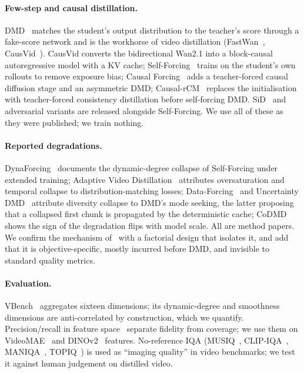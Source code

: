 \documentclass[10pt,twocolumn,letterpaper]{article}
\begin{document}
\paragraph{Few-step and causal distillation.} DMD~\cite{dmd,dmd2} matches the student's output distribution to the teacher's score through a fake-score network and is the workhorse of video distillation (FastWan~\cite{fastwan}, CausVid~\cite{causvid}). CausVid converts the bidirectional Wan2.1 into a block-causal autoregressive model with a KV cache; Self-Forcing~\cite{selfforcing} trains on the student's own rollouts to remove exposure bias; Causal Forcing~\cite{causalforcing} adds a teacher-forced causal diffusion stage and an asymmetric DMD; Causal-rCM~\cite{causalrcm,rcm} replaces the initialisation with teacher-forced consistency distillation before self-forcing DMD. SiD~\cite{sid} and adversarial variants are released alongside Self-Forcing. We use all of these as they were published; we train nothing.

\paragraph{Reported degradations.} DynaForcing~\cite{dynaforcing} documents the dynamic-degree collapse of Self-Forcing under extended training; Adaptive Video Distillation~\cite{avd} attributes oversaturation and temporal collapse to distribution-matching losses; Data-Forcing~\cite{dataforcing} and Uncertainty DMD~\cite{uncertaintydmd} attribute diversity collapse to DMD's mode seeking, the latter proposing that a collapsed first chunk is propagated by the deterministic cache; CoDMD~\cite{codmd} shows the sign of the degradation flips with model scale. All are method papers. We confirm the mechanism of~\cite{uncertaintydmd} with a factorial design that isolates it, and add that it is objective-specific, mostly incurred before DMD, and invisible to standard quality metrics.

\paragraph{Evaluation.} VBench~\cite{vbench} aggregates sixteen dimensions; its dynamic-degree and smoothness dimensions are anti-correlated by construction, which we quantify. Precision/recall in feature space~\cite{prdc,kynk} separate fidelity from coverage; we use them on VideoMAE~\cite{videomae} and DINOv2~\cite{dinov2} features. No-reference IQA (MUSIQ~\cite{musiq}, CLIP-IQA~\cite{clipiqa}, MANIQA~\cite{maniqa}, TOPIQ~\cite{topiq}) is used as ``imaging quality'' in video benchmarks; we test it against human judgement on distilled video.
\end{document}
